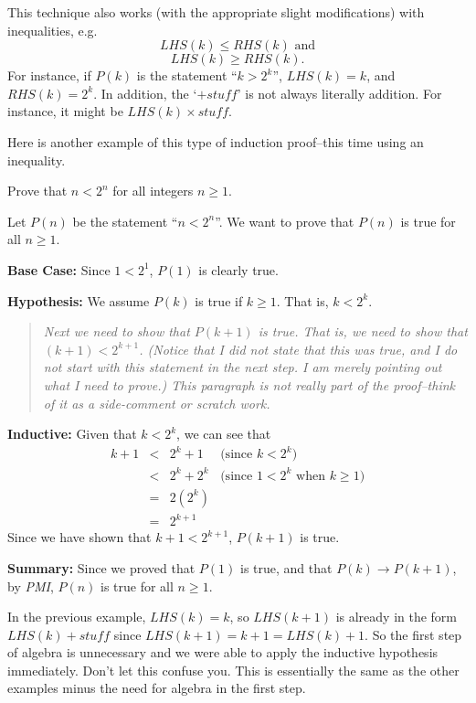 This technique also works (with the appropriate slight modifications) 
with inequalities, e.g.
$$LHS(k)\leq RHS(k) \mbox{ and}$$
$$LHS(k)\geq RHS(k).$$ 
For instance, if $P(k)$ is the statement ``$k>2^k$'', $LHS(k)=k$, and $RHS(k)=2^k$.
In addition, the `$+stuff$' is not always literally addition.  For instance, it might be
$LHS(k)\times stuff$.

Here is another example of this type of induction proof--this time using an 
inequality. 

\begin{exa}
Prove that $n<2^n$ for all integers $n\geq 1$.
\begin{pf} 
Let $P(n)$ be the statement ``$n<2^n$''.
We want to prove that $P(n)$ is true for all $n\geq 1$.

\noindent
{\bf Base Case:} Since $1<2^1$, $P(1)$ is clearly true.

\noindent
{\bf Hypothesis:} We assume $P(k)$ is true if $k\geq 1$.  That is, $k<2^k$.
\begin{quote}
{\em Next we need to show that $P(k+1)$ is true.
That is, we need to show that $(k+1)<2^{k+1}$.  (Notice that I did not
state that this was true, and I do not start with this statement in the next step.
I am merely pointing out what I {\em need to prove}.)  This paragraph is not
really part of the proof--think of it as a side-comment or scratch work.}
\end{quote}
{\bf Inductive:}
Given that $k<2^k$, we can see that 
$$
\begin{array}{llll}
k+1&<&2^k+1&\mbox{(since $k<2^k$)}\\
   &<&2^k+2^k&\mbox{(since $1<2^k$ when $k\geq 1$)}\\
   &=&2(2^k)&\\
   &=&2^{k+1}&
\end{array}
$$
Since we have shown that $k+1<2^{k+1}$, $P(k+1)$ is true.

\noindent
{\bf Summary:} 
Since we proved that $P(1)$ is true, and that
$P(k)\rightarrow P(k+1)$,
by {\em PMI}, $P(n)$ is
true for all $n\geq 1$.
\end{pf}
\end{exa}

In the previous example, $LHS(k)=k$, so $LHS(k+1)$ is already in the form
$LHS(k)+stuff$ since $LHS(k+1)=k+1=LHS(k)+1$. So the first step of algebra is unnecessary
and we were able to apply the inductive hypothesis immediately.
Don't let this confuse you.  This is essentially the same as the other examples minus 
the need for algebra in the first step.

